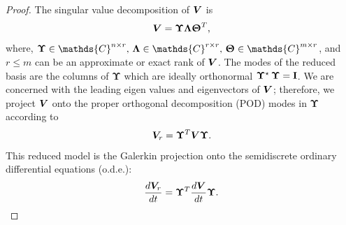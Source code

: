 \begin{proof}
	The  singular value decomposition of $\bm{V}$ is 
	\begin{align}
		\bm{V} = \bm{\Upsilon} \bm{\Lambda} \bm{\Uptheta}^T,
	\end{align}
	where, $\bm{\Upsilon} \in \mathds{C}^{n\times r}, \, \bm{\Lambda} \in \mathds{C}^{r\times r}, \, \bm{\Uptheta} \in \mathds{C}^{m\times r}$,
	and $r\le m$ can be an approximate or exact rank of $\bm{V}$. The modes of the reduced basis are the columns of $\bm{\Upsilon}$ which are ideally orthonormal  \ie $\bm{\Upsilon}^\star\, \bm{\Upsilon} = \mathbf{I}$. We are concerned with the leading eigen values and eigenvectors of $\bm{V}$; therefore, we project $\bm{V}$ onto the proper orthogonal decomposition (POD) modes in $\bm{\Upsilon}$ according to 
	\begin{align}
		\bm{V}_r = \bm{\Upsilon}^T \bm{V} \bm{\Upsilon}.
	\end{align}
	This reduced model is the Galerkin projection onto the semidiscrete ordinary differential equations (o.d.e.):
	\begin{align}
		\dfrac{d \bm{V}_r}{dt} = \bm{\Upsilon}^T \dfrac{d \bm{V}}{dt} \bm{\Upsilon}.
	\end{align}
	

\end{proof}
